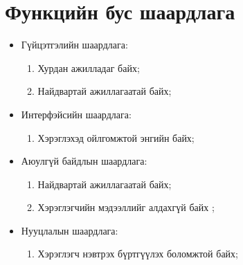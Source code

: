 \section{Функцийн бус шаардлага}
\begin{itemize}
	\item Гүйцэтгэлийн шаардлага:
	\begin{enumerate}
		\item Хурдан ажилладаг байх;
		\item Найдвартай ажиллагаатай байх;
	\end{enumerate}
	\item Интерфэйсийн шаардлага:
	\begin{enumerate}
	    \item Хэрэглэхэд ойлгомжтой энгийн байх;
	\end{enumerate}
	\item Аюулгүй байдлын шаардлага: 
	\begin{enumerate}
	    \item Найдвартай ажиллагаатай байх;
 		\item Хэрэглэгчийн мэдээллийг алдахгүй байх ;
	\end{enumerate}
 	\item Нууцлалын шаардлага:
 	\begin{enumerate}
 		\item Хэрэглэгч нэвтрэх бүртгүүлэх боломжтой байх;
 	\end{enumerate}
\end{itemize}


